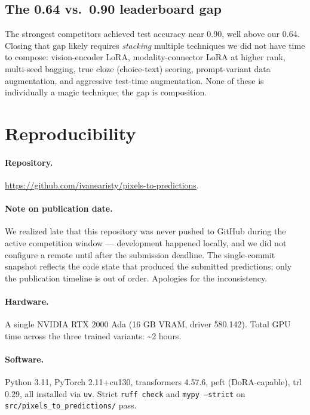 \documentclass[11pt]{article}
\begin{document}
\subsection{The 0.64 vs.\ 0.90 leaderboard gap}

The strongest competitors achieved test accuracy near 0.90, well above our 0.64. Closing that gap likely requires \textit{stacking} multiple techniques we did not have time to compose: vision-encoder LoRA, modality-connector LoRA at higher rank, multi-seed bagging, true cloze (choice-text) scoring, prompt-variant data augmentation, and aggressive test-time augmentation. None of these is individually a magic technique; the gap is composition.

\section{Reproducibility}

\paragraph{Repository.} \url{https://github.com/ivanearisty/pixels-to-predictions}.

\paragraph{Note on publication date.} We realized late that this repository was never pushed to GitHub during the active competition window --- development happened locally, and we did not configure a remote until after the submission deadline. The single-commit snapshot reflects the code state that produced the submitted predictions; only the publication timeline is out of order. Apologies for the inconsistency.

\paragraph{Hardware.} A single NVIDIA RTX 2000 Ada (16 GB VRAM, driver 580.142). Total GPU time across the three trained variants: \textasciitilde 2 hours.

\paragraph{Software.} Python 3.11, PyTorch 2.11+cu130, transformers 4.57.6, peft (DoRA-capable), trl 0.29, all installed via \texttt{uv}. Strict \texttt{ruff check} and \texttt{mypy --strict} on \texttt{src/pixels\_to\_predictions/} pass.
\end{document}
